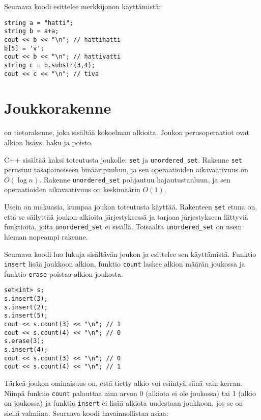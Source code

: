 Seuraava koodi esittelee merkkijonon käyttämistä:

\begin{lstlisting}
string a = "hatti";
string b = a+a;
cout << b << "\n"; // hattihatti
b[5] = 'v';
cout << b << "\n"; // hattivatti
string c = b.substr(3,4);
cout << c << "\n"; // tiva
\end{lstlisting}

\section{Joukkorakenne}



 on tietorakenne,
joka sisältää kokoelman alkioita.
Joukon perusoperaatiot ovat alkion lisäys,
haku ja poisto.

C++ sisältää kaksi
toteutusta joukolle: \texttt{set} ja \texttt{unordered\_set}.
Rakenne \texttt{set} perustuu tasapainoiseen
binääripuuhun, ja sen operaatioiden aikavaativuus
on $O(\log n)$.
Rakenne \texttt{unordered\_set} pohjautuu hajautustauluun,
ja sen operaatioiden aikavaativuus on keskimäärin $O(1)$.

Usein on makuasia, kumpaa joukon toteutusta käyttää.
Rakenteen \texttt{set} etuna on, että se säilyttää
joukon alkioita järjestyksessä ja tarjoaa
järjestykseen liittyviä funktioita,
joita \texttt{unordered\_set} ei sisällä.
Toisaalta \texttt{unordered\_set} on usein hieman nopeampi
rakenne.

Seuraava koodi luo lukuja sisältävän joukon ja
esittelee sen käyttämistä.
Funktio \texttt{insert} lisää joukkoon alkion,
funktio \texttt{count} laskee alkion määrän joukossa
ja funktio \texttt{erase} poistaa alkion joukosta.

\begin{lstlisting}
set<int> s;
s.insert(3);
s.insert(2);
s.insert(5);
cout << s.count(3) << "\n"; // 1
cout << s.count(4) << "\n"; // 0
s.erase(3);
s.insert(4);
cout << s.count(3) << "\n"; // 0
cout << s.count(4) << "\n"; // 1
\end{lstlisting}

Tärkeä joukon ominaisuus on,
että tietty alkio voi esiintyä siinä
vain kerran.
Niinpä funktio \texttt{count} palauttaa aina
arvon 0 (alkiota ei ole joukossa) tai 1 (alkio on joukossa)
ja funktio \texttt{insert} ei lisää alkiota
uudestaan joukkoon, jos se on siellä valmiina.
Seuraava koodi havainnollistaa asiaa:

